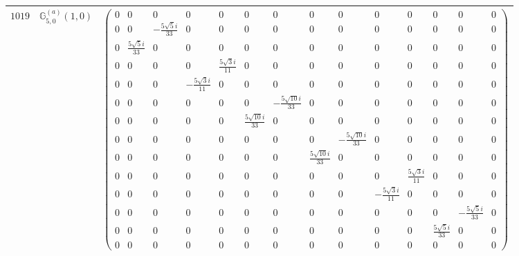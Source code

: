 \documentclass[fleqn,8pt,landscape]{jsarticle}
\begin{document}
\begin{center}
\begin{longtable}{ccc}
$ 1019 $ & $ \mathbb{G}_{5,0}^{(a)}(1,0) $ & $ \begin{pmatrix} 0 & 0 & 0 & 0 & 0 & 0 & 0 & 0 & 0 & 0 & 0 & 0 & 0 & 0 \\ 0 & 0 & - \frac{5 \sqrt{5} i}{33} & 0 & 0 & 0 & 0 & 0 & 0 & 0 & 0 & 0 & 0 & 0 \\ 0 & \frac{5 \sqrt{5} i}{33} & 0 & 0 & 0 & 0 & 0 & 0 & 0 & 0 & 0 & 0 & 0 & 0 \\ 0 & 0 & 0 & 0 & \frac{5 \sqrt{3} i}{11} & 0 & 0 & 0 & 0 & 0 & 0 & 0 & 0 & 0 \\ 0 & 0 & 0 & - \frac{5 \sqrt{3} i}{11} & 0 & 0 & 0 & 0 & 0 & 0 & 0 & 0 & 0 & 0 \\ 0 & 0 & 0 & 0 & 0 & 0 & - \frac{5 \sqrt{10} i}{33} & 0 & 0 & 0 & 0 & 0 & 0 & 0 \\ 0 & 0 & 0 & 0 & 0 & \frac{5 \sqrt{10} i}{33} & 0 & 0 & 0 & 0 & 0 & 0 & 0 & 0 \\ 0 & 0 & 0 & 0 & 0 & 0 & 0 & 0 & - \frac{5 \sqrt{10} i}{33} & 0 & 0 & 0 & 0 & 0 \\ 0 & 0 & 0 & 0 & 0 & 0 & 0 & \frac{5 \sqrt{10} i}{33} & 0 & 0 & 0 & 0 & 0 & 0 \\ 0 & 0 & 0 & 0 & 0 & 0 & 0 & 0 & 0 & 0 & \frac{5 \sqrt{3} i}{11} & 0 & 0 & 0 \\ 0 & 0 & 0 & 0 & 0 & 0 & 0 & 0 & 0 & - \frac{5 \sqrt{3} i}{11} & 0 & 0 & 0 & 0 \\ 0 & 0 & 0 & 0 & 0 & 0 & 0 & 0 & 0 & 0 & 0 & 0 & - \frac{5 \sqrt{5} i}{33} & 0 \\ 0 & 0 & 0 & 0 & 0 & 0 & 0 & 0 & 0 & 0 & 0 & \frac{5 \sqrt{5} i}{33} & 0 & 0 \\ 0 & 0 & 0 & 0 & 0 & 0 & 0 & 0 & 0 & 0 & 0 & 0 & 0 & 0 \end{pmatrix} $ \\ \hline

\end{longtable}
\end{center}
\end{document}
